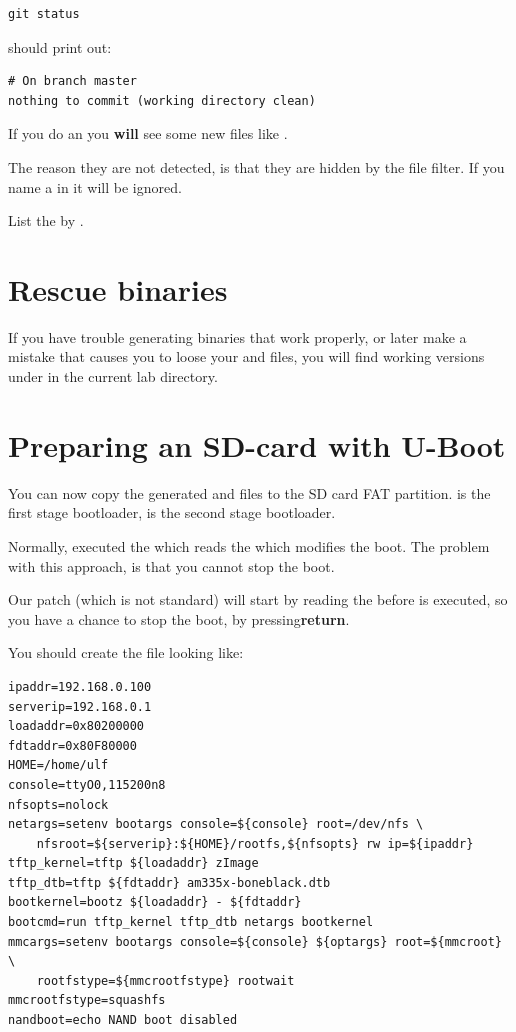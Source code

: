 {\small
\begin{verbatim}
git status
\end{verbatim}
}

should print out:

\begin{verbatim}
# On branch master
nothing to commit (working directory clean)
\end{verbatim}

If you do an  you {\bf will} see some new files like .

The reason they are not detected, is that they are hidden by the  file 
filter. If you name a  in  it will be ignored.

List the  by .

\section{Rescue binaries}

If you have trouble generating binaries that work properly, or later
make a mistake that causes you to loose your  and
 files, you will find working versions under
 in the current lab directory.

\clearpage

\section{Preparing an SD-card with U-Boot}
You can now copy the generated  and  files
to the SD card FAT partition.  is the first stage bootloader,
 is the second stage bootloader.

Normally,  executed the  which reads the
 which modifies the boot. The problem with this approach, is
that you cannot stop the boot.

Our patch (which is not standard) will start by reading the 
before  is executed, so you have a chance to stop the boot,
by pressing{\bf return}.

You should create the file  looking like:

\begin{verbatim}
ipaddr=192.168.0.100
serverip=192.168.0.1
loadaddr=0x80200000
fdtaddr=0x80F80000
HOME=/home/ulf
console=ttyO0,115200n8
nfsopts=nolock
netargs=setenv bootargs console=${console} root=/dev/nfs \
	nfsroot=${serverip}:${HOME}/rootfs,${nfsopts} rw ip=${ipaddr}
tftp_kernel=tftp ${loadaddr} zImage
tftp_dtb=tftp ${fdtaddr} am335x-boneblack.dtb
bootkernel=bootz ${loadaddr} - ${fdtaddr}
bootcmd=run tftp_kernel tftp_dtb netargs bootkernel
mmcargs=setenv bootargs console=${console} ${optargs} root=${mmcroot} \
	rootfstype=${mmcrootfstype} rootwait
mmcrootfstype=squashfs
nandboot=echo NAND boot disabled
\end{verbatim}

